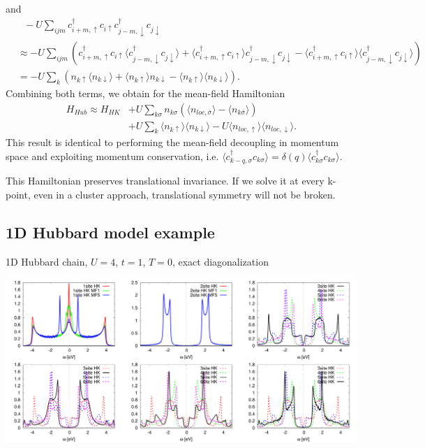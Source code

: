 \documentclass[12pt,a4paper]{scrartcl}
\numberwithin{equation}{section}
\begin{document}
and 
\begin{align}
 & \ \ \ -U\sum_{ijm}  c^{\dagger}_{i+m,\uparrow} c_{i\uparrow}  c^{\dagger}_{j-m,\downarrow}c_{j\downarrow}  \nonumber \\
 &\approx
 -U\sum_{ijm}  
 \left( 
      c^{\dagger}_{i+m,\uparrow} c_{i\uparrow} \langle c^{\dagger}_{j-m,\downarrow}c_{j\downarrow} \rangle
      +\langle c^{\dagger}_{i+m,\uparrow} c_{i\uparrow}\rangle  c^{\dagger}_{j-m,\downarrow}c_{j\downarrow} 
      - \langle c^{\dagger}_{i+m,\uparrow} c_{i\uparrow}\rangle \langle c^{\dagger}_{j-m,\downarrow}c_{j\downarrow} \rangle
  \right) \nonumber \\
%
&=
 -U\sum_{k}
 \left(
      n_{k\uparrow} \langle n_{k\downarrow} \rangle
      +\langle n_{k\uparrow} \rangle  n_{k\downarrow}
      - \langle n_{k\uparrow}\rangle \langle n_{k\downarrow} \rangle
  \right) .
\end{align}
Combining both terms, we obtain for the mean-field Hamiltonian
\begin{align}
 H_{Hub}
 \approx H_{HK} &+
   U \sum_{k\sigma}  n_{k\sigma}  \left( \langle n_{loc,\bar{\sigma}} \rangle - \langle n_{k\bar{\sigma}} \rangle \right)  \nonumber \\
  &+U\sum_{k}\langle n_{k\uparrow}\rangle \langle n_{k\downarrow} \rangle
  - U \langle n_{loc,\uparrow} \rangle \langle n_{loc,\downarrow} \rangle.
\end{align}
This result is identical to performing the mean-field decoupling in momentum space
and exploiting momentum conservation, i.e. 
$\langle c^{\dagger}_{k-q,\sigma}c_{k\sigma} \rangle = \delta(q) \langle c^{\dagger}_{k\sigma}c_{k\sigma} \rangle$.

This Hamiltonian preserves translational invariance. If we solve it at every k-point,
even in a cluster approach, translational symmetry will not be broken.

\subsection{1D Hubbard model example}
1D Hubbard chain, $U=4$, $t=1$, $T=0$, exact diagonalization

\includegraphics[width=1\textwidth]{HatsugaiKohmoto/1D_HK.pdf}
\end{document}

